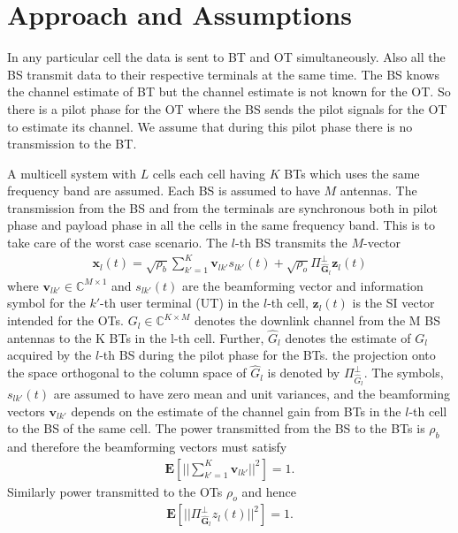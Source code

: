 \documentclass[10pt, a4paper, twoside,fleqn]{article}
\begin{document}
\section{Approach and Assumptions}	
	In any particular cell the data is sent to BT and OT simultaneously. Also all the BS transmit data to their respective terminals at the same time. The BS knows the channel estimate of BT but the channel estimate is not known for the OT. So there is a pilot phase for the OT where the BS sends the pilot signals for the OT to estimate its channel. We assume that during this pilot phase there is no transmission to the BT.

	A multicell system with $L$ cells each cell having $K$ BTs which uses the same frequency band are assumed. Each BS is assumed to have $M$ antennas. The transmission from the BS and from the terminals are synchronous both in pilot phase and payload phase in all the cells in the same frequency band. This is to take care of the worst case scenario. The $l$-th BS transmits the $M$-vector
\begin{eqnarray}\label{eqn:txbt}
	\pmb{x}_l(t) = \sqrt{\rho_b}\sum\limits_{k'=1}^{K}\boldsymbol{v}_{lk'}s_{lk'}(t)
    		      + \sqrt{\rho_o}\Pi^{\perp}_{{\pmb{\hat{G}}_l}}\pmb{z}_l(t)
\end{eqnarray}
where $\pmb{v}_{lk'}\in\mathbb{C}^{M\times 1}$ and $s_{lk'}(t)$ are the beamforming vector and information symbol for the $k'$-th user terminal (UT) in the $l$-th cell, $\pmb{z}_l(t)$ is the SI vector intended for the OTs. $G_l \in {\mathbb C}^{K \times M}$ denotes the downlink channel from the M BS antennas to the K BTs in the l-th cell. Further, ${\widehat G}_l$ denotes the estimate of $G_l$ acquired by the $l$-th BS during the pilot phase for the BTs. the projection onto the space orthogonal to the column space of $\hat G_l$ is denoted by $\Pi^{\perp}_{{\hat{G}_l}}$. The symbols, $s_{lk'}(t)$ are assumed to have zero mean and unit variances, and the beamforming vectors $\pmb{v}_{lk'}$ depends on the estimate of the channel gain from BTs in the $l$-th cell to the BS of the same cell. 
The power transmitted from the BS to the BTs is $\rho_b$ and therefore the beamforming vectors must satisfy
\begin{eqnarray}\label{eqn:vkcondtion}
	\pmb{E}\left[||\sum\limits_{k'=1}^{K}\pmb{v}_{lk'}||^2\right]=1.
\end{eqnarray}
Similarly power transmitted to the OTs $\rho_o$ and hence
\begin{eqnarray}\label{eqn:zlcondition}
	\pmb{E}\left[||\Pi^{\perp}_{\pmb{\hat{G}}_l}z_l(t)||^2\right]=1.
\end{eqnarray}
\end{document}
